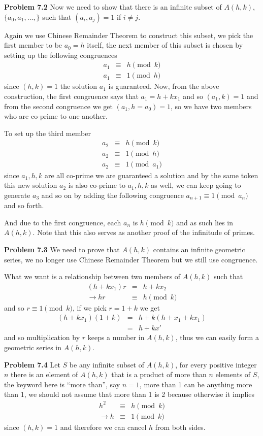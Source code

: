 \documentclass[aps,preprint,preprintnumbers,nofootinbib,showpacs,prd]{revtex4-1}
\newcommand{\nbea}{\begin{eqnarray*}}
\newcommand{\neea}{\end{eqnarray*}}
\begin{document}
{\bf Problem 7.2} Now we need to show that there is an infinite subset of $A(h,k)$, $\{a_0, a_1, \dots, \}$ such that $(a_i,a_j) = 1$ if $i \neq j$.

Again we use Chinese Remainder Theorem to construct this subset, we pick the first member to be $a_0 = h$ itself, the next member of this subset is chosen by setting up the following congruences
%
\nbea
a_1 & \equiv & h \pmod{k} \\
a_1 & \equiv & 1 \pmod{h}
\neea
%
since $(h,k)=1$ the solution $a_1$ is guaranteed. Now, from the above construction, the first congruence says that $a_1 = h + kx_1$ and so $(a_1, k) = 1$ and from the second congruence we get $(a_1, h = a_0) = 1$, so we have two members who are co-prime to one another.

To set up the third member
%
\nbea
a_2 & \equiv & h \pmod{k} \\
a_2 & \equiv & 1 \pmod{h} \\
a_2 & \equiv & 1 \pmod{a_1}
\neea
%
since $a_1, h, k$ are all co-prime we are guaranteed a solution and by the same token this new solution $a_2$ is also co-prime to $a_1, h, k$ as well, we can keep going to generate $a_3$ and so on by adding the following congruence $a_{n+1} \equiv 1 \pmod{a_n}$ and so forth.

And due to the first congruence, each $a_n$ is $h \pmod{k}$ and as such lies in $A(h,k)$. Note that this also serves as another proof of the infinitude of primes.

{\bf Problem 7.3} We need to prove that $A(h,k)$ contains an infinite geometric series, we no longer use Chinese Remainder Theorem but we still use congruence.

What we want is a relationship between two members of $A(h,k)$ such that
%
\nbea
(h + kx_1) r & = & h + kx_2 \\
\to hr & \equiv & h \pmod{k}
\neea
%
and so $r \equiv 1 \pmod{k}$, if we pick $r = 1 + k$ we get
%
\nbea
(h + kx_1) (1 + k) & = & h + k(h + x_1 + kx_1) \\
& = & h + kx'
\neea
%
and so multiplication by $r$ keeps a number in $A(h,k)$, thus we can easily form a geometric series in $A(h,k)$.

{\bf Problem 7.4} Let $S$ be any infinite subset of $A(h,k)$, for every positive integer $n$ there is an element of $A(h,k)$ that is a product of more than $n$ elements of $S$, the keyword here is ``more than'', say $n=1$, more than 1 can be anything more than 1, we should not assume that more than 1 is 2 because otherwise it implies
%
\nbea
h^2 & \equiv & h \pmod{k} \\
\to h & \equiv & 1 \pmod{k}
\neea
%
since $(h,k) = 1$ and therefore we can cancel $h$ from both sides.
\end{document}
